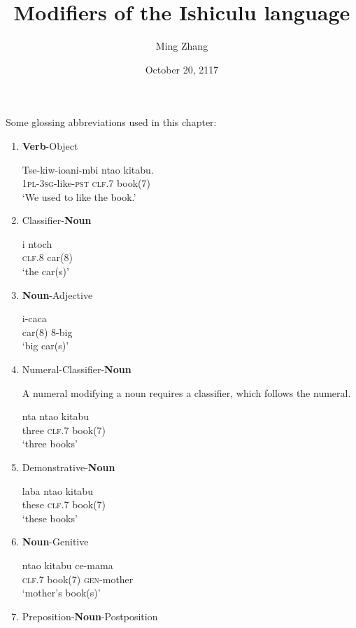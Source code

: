 \documentclass[12pt, oneside]{article}
\title{Modifiers of the Ishiculu language}
\author{Ming Zhang}
\date{October 20, 2117}
\begin{document}
\maketitle

Some glossing abbreviations used in this chapter: 

\begin{enumerate}
\item \textbf{Verb}-Object
\begin{exe}
\ex
\gll Tse-kiw-ioani-mbi nta\textbeltl o kitabu. \\
\textsc{1pl}-\textsc{3sg}-like-\textsc{pst} \textsc{clf}.7 book(7) \\
\trans `We used to like the book.'
\end{exe}
\item Classifier-\textbf{Noun}
\begin{exe}
\ex
\gll i {ntoch\textramshorns} \\
\textsc{clf.8} car(8) \\
\trans `the car(s)'
\end{exe}
\item \textbf{Noun}-Adjective
\begin{exe}
\ex
{} i-caca \\
car(8) 8-big \\
\trans `big car(s)'
\end{exe}
\item Numeral-Classifier-\textbf{Noun}

A numeral modifying a noun requires a classifier, which follows the numeral.
\begin{exe}
\ex
\gll nta nta\textbeltl o kitabu \\
three \textsc{clf.7} book(7) \\
\trans `three books'
\end{exe}
\item Demonstrative-\textbf{Noun}
\begin{exe}
\ex
\gll laba nta\textbeltl o kitabu \\
these \textsc{clf.7} book(7) \\
\trans `these books'
\end{exe}
\item \textbf{Noun}-Genitive
\begin{exe}
\ex
\gll nta\textbeltl o kitabu ce-mama \\
\textsc{clf.7} book(7) \textsc{gen}-mother \\
\trans `mother's book(s)'
\end{exe}
\item Preposition-\textbf{Noun}-Postposition


\end{enumerate}
\end{document}
